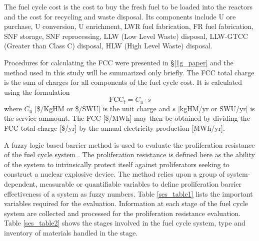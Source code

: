 The fuel cycle cost is the cost to buy the fresh fuel to be loaded into
the reactors and the cost for recycling and waste disposal.  Its
components include U ore purchase, U conversion, U enrichment, LWR fuel
fabrication, FR fuel fabrication, SNF storage, SNF reprocessing, LLW
(Low Level Waste) disposal, LLW-GTCC (Greater than Class C) disposal,
HLW (High Level Waste) disposal. 

Procedures for calculating the FCC were presented in \S \ref{1g_paper} and the
method used in this study will be summarized only briefly.  The FCC
total charge is the sum of charges for all components of the fuel cycle
cost.  It is calculated using the formulation
\begin{equation}
\label{ses_FCC}
\mbox{FCC}_t = C_u \cdot s
\end{equation}
where $C_u$ [\$/KgHM or \$/SWU] is the unit charge and $s$ [kgHM/yr or SWU/yr] 
is the service ammount. The FCC [\$/MWh] may then be obtained by dividing the 
FCC total charge [\$/yr] by the annual electricity production [MWh/yr].

A fuzzy logic based barrier method is used to evaluate the
proliferation resistance of the fuel cycle system \cite{Li2009}. The proliferation
resistance is defined here as the ability of the system to intrinsically
protect itself against proliferators seeking to construct a nuclear
explosive device. The method relies upon a group of system-dependent,
measurable or quantifiable variables to define proliferation barrier
effectiveness of a system as fuzzy numbers. 
Table \ref{ses_table1} lists the important variables required for
the evaluation. Information at each stage of the fuel cycle system are
collected and processed for the proliferation resistance evaluation.
Table \ref{ses_table2} shows the stages involved in the fuel cycle system, type and
inventory of materials handled in the stage.


